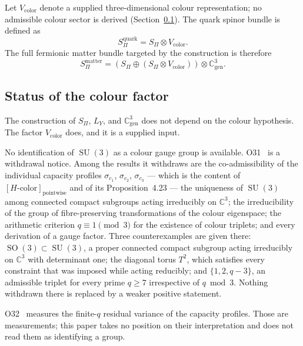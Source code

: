\documentclass[11pt,a4paper]{article}
\theoremstyle{definition}
\theoremstyle{remark}
\newcommand{\SU}{\operatorname{SU}}
\begin{document}
  Let $V_{\mathrm{color}}$ denote a supplied three-dimensional colour representation; no
  admissible colour sector is derived (Section~\ref{ssec:colour-status}).
  The quark spinor bundle is defined as
  \begin{equation}
    \label{eq:quark-bundle}
    S_\Pi^{\mathrm{quark}} = S_\Pi \otimes V_{\mathrm{color}} .
  \end{equation}
  The full fermionic matter bundle targeted by the construction is therefore
  \begin{equation}
    \label{eq:matter-bundle-full}
    S_\Pi^{\mathrm{matter}}
    =
    \left(
      S_\Pi \oplus (S_\Pi \otimes V_{\mathrm{color}})
    \right)
    \otimes \mathbb{C}^3_{\mathrm{gen}} .
  \end{equation}

  \subsection{Status of the colour factor}
    \label{ssec:colour-status}

    The construction of $S_\Pi$, $L_Y$, and $\mathbb{C}^3_{\mathrm{gen}}$ does not
    depend on the colour hypothesis.
    The factor $V_{\mathrm{color}}$ does, and it is a supplied input.

    No identification of $\SU(3)$ as a colour gauge group is available.
    O31~\cite{Beau2026a35} is a withdrawal notice.
    Among the results it withdraws are the co-admissibility of the individual capacity profiles
    $\sigma_{c_1}$, $\sigma_{c_2}$, $\sigma_{c_3}$ --- which is the content of
    $[H\text{-color}]_{\mathrm{pointwise}}$ and of its Proposition~4.23 --- the uniqueness of
    $\SU(3)$ among connected compact subgroups acting irreducibly on $\mathbb{C}^3$; the
    irreducibility of the group of fibre-preserving transformations of the colour eigenspace; the
    arithmetic criterion $q \equiv 1 \pmod 3$ for the existence of colour triplets; and every
    derivation of a gauge factor.
    Three counterexamples are given there: $\operatorname{SO}(3) \subset \SU(3)$, a proper
    connected compact subgroup acting irreducibly on $\mathbb{C}^3$ with determinant one; the diagonal torus $T^2$,
    which satisfies every constraint that was imposed while acting reducibly; and
    $\{1, 2, q-3\}$, an admissible triplet for every prime $q \geq 7$ irrespective of
    $q \bmod 3$.
    Nothing withdrawn there is replaced by a weaker positive statement.

    O32~\cite{Beau2026a36} measures the finite-$q$ residual variance of the capacity profiles.
    Those are measurements; this paper takes no position on their interpretation and does not read
    them as identifying a group.
\end{document}
